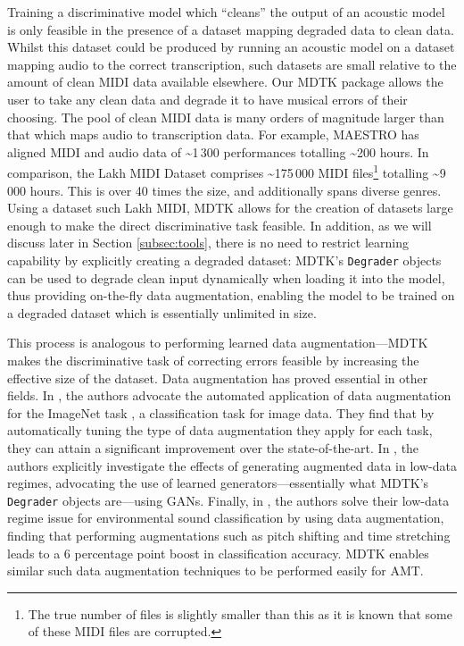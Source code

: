 \documentclass{article}
\begin{document}
Training a discriminative model which ``cleans'' the output of an acoustic model is only feasible in the presence of a dataset mapping degraded data to clean data. Whilst this dataset could be produced by running an acoustic model on a dataset mapping audio to the correct transcription, such datasets are small relative to the amount of clean MIDI data available elsewhere. Our MDTK package allows the user to take any clean data and degrade it to have musical errors of their choosing. The pool of clean MIDI data is many orders of magnitude larger than that which maps audio to transcription data. For example, MAESTRO \cite{hawthorne2018enabling} has aligned MIDI and audio data of \textasciitilde{}1\,300 performances totalling \textasciitilde{}200 hours. In comparison, the Lakh MIDI Dataset \cite{raffel2016learning} comprises \textasciitilde{}175\,000 MIDI files\footnote{The true number of files is slightly smaller than this as it is known that some of these MIDI files are corrupted.} totalling \textasciitilde{}9\,000 hours. This is over 40 times the size, and additionally spans diverse genres. Using a dataset such Lakh MIDI, MDTK allows for the creation of datasets large enough to make the direct discriminative task feasible. In addition, as we will discuss later in Section \ref{subsec:tools}, there is no need to restrict learning capability by explicitly creating a degraded dataset: MDTK's \texttt{\mbox{Degrader}} objects can be used to degrade clean input dynamically when loading it into the model, thus providing on-the-fly data augmentation, enabling the model to be trained on a degraded dataset which is essentially unlimited in size.

This process is analogous to performing learned data augmentation---MDTK makes the discriminative task of correcting errors feasible by increasing the effective size of the dataset. Data augmentation has proved essential in other fields. In \cite{Cubuk2019CVPR}, the authors advocate the automated application of data augmentation for the ImageNet task \cite{imagenetcvpr09}, a classification task for image data. They find that by automatically tuning the type of data augmentation they apply for each task, they can attain a significant improvement over the state-of-the-art. In \cite{antoniou2017data}, the authors explicitly investigate the effects of generating augmented data in low-data regimes, advocating the use of learned generators---essentially what MDTK's \texttt{\mbox{Degrader}} objects are---using GANs. Finally, in \cite{7829341}, the authors solve their low-data regime issue for environmental sound classification by using data augmentation, finding that performing augmentations such as pitch shifting and time stretching leads to a 6 percentage point boost in classification accuracy. MDTK enables similar such data augmentation techniques to be performed easily for AMT.
\end{document}
